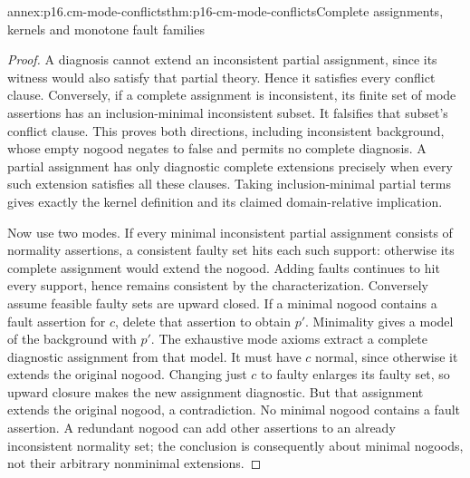 \begin{annexitem}{annex:p16.cm-mode-conflicts}{thm:p16-cm-mode-conflicts}{Complete assignments, kernels and monotone fault families}
\begin{proof}
A diagnosis cannot extend an inconsistent partial assignment, since its
witness would also satisfy that partial theory. Hence it satisfies every
conflict clause. Conversely, if a complete assignment is inconsistent,
its finite set of mode assertions has an inclusion-minimal inconsistent
subset. It falsifies that subset's conflict clause. This proves both
directions, including inconsistent background, whose empty nogood negates
to false and permits no complete diagnosis. A partial assignment has only
diagnostic complete extensions precisely when every such extension satisfies
all these clauses. Taking inclusion-minimal partial terms gives exactly
the kernel definition and its claimed domain-relative implication.

Now use two modes. If every minimal inconsistent partial assignment consists
of normality assertions, a consistent faulty set hits each such support:
otherwise its complete assignment would extend the nogood. Adding faults
continues to hit every support, hence remains consistent by the characterization.
Conversely assume feasible faulty sets are upward closed. If a minimal
nogood contains a fault assertion for \(c\), delete that assertion to
obtain \(p'\). Minimality gives a model of the background with \(p'\).
The exhaustive mode axioms extract a complete diagnostic assignment from
that model. It must have \(c\) normal, since otherwise it extends the
original nogood. Changing just \(c\) to faulty enlarges its faulty set,
so upward closure makes the new assignment diagnostic. But that assignment
extends the original nogood, a contradiction. No minimal nogood contains
a fault assertion. A redundant nogood can add other assertions to an
already inconsistent normality set; the conclusion is consequently about
minimal nogoods, not their arbitrary nonminimal extensions.
\end{proof}
\end{annexitem}


